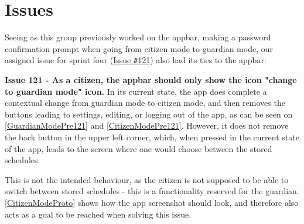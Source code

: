 \section{Issues}\label{SEC:Sprint4Issues}
Seeing as this group previously worked on the appbar, making a password confirmation prompt when going from citizen mode to guardian mode, our assigned issue for sprint four (\href{https://github.com/aau-giraf/weekplanner/issues/121}{Issue \texttt{\#}121}) also had its ties to the appbar:

\textbf{Issue 121 - As a citizen, the appbar should only show the icon "change to guardian mode" icon.} In its current state, the app does complete a contextual change from guardian mode to citizen mode, and then removes the buttons leading to settings, editing, or logging out of the app, as can be seen on \autoref{GuardianModePre121} and \autoref{CitizenModePre121}.
However, it does not remove the back button in the upper left corner, which, when pressed in the current state of the app, leads to the screen where one would choose between the stored schedules.


This is not the intended behaviour, as the citizen is not supposed to be able to switch between stored schedules - this is a functionality reserved for the guardian.
\autoref{CitizenModeProto} shows how the app screenshot should look, and therefore also acts as a goal to be reached when solving this issue.

